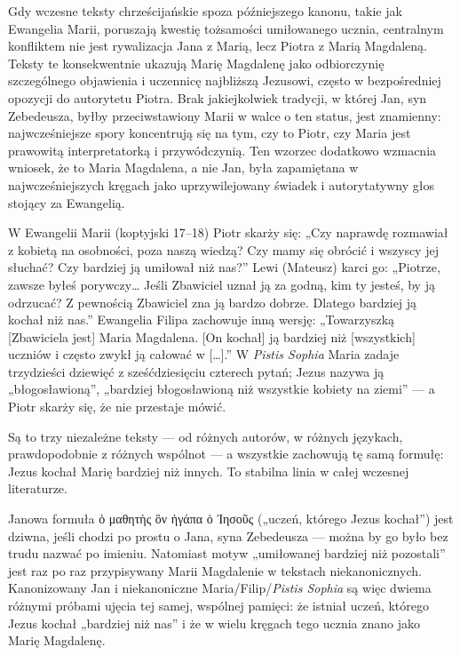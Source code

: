 Gdy wczesne teksty chrześcijańskie spoza późniejszego kanonu, takie jak Ewangelia Marii, poruszają kwestię tożsamości umiłowanego ucznia, centralnym konfliktem nie jest rywalizacja Jana z Marią, lecz Piotra z Marią Magdaleną.
Teksty te konsekwentnie ukazują Marię Magdalenę jako odbiorczynię szczególnego objawienia i uczennicę najbliższą Jezusowi, często w bezpośredniej opozycji do autorytetu Piotra.
Brak jakiejkolwiek tradycji, w której Jan, syn Zebedeusza, byłby przeciwstawiony Marii w walce o ten status, jest znamienny:
najwcześniejsze spory koncentrują się na tym, czy to Piotr, czy Maria jest prawowitą interpretatorką i przywódczynią.
Ten wzorzec dodatkowo wzmacnia wniosek, że to Maria Magdalena, a nie Jan, była zapamiętana w najwcześniejszych kręgach jako uprzywilejowany świadek i autorytatywny głos stojący za Ewangelią.

W Ewangelii Marii (koptyjski 17--18) Piotr skarży się:
„Czy naprawdę rozmawiał z kobietą na osobności, poza naszą wiedzą?
Czy mamy się obrócić i wszyscy jej słuchać?
Czy bardziej ją umiłował niż nas?”
Lewi (Mateusz) karci go:
„Piotrze, zawsze byłeś porywczy\ldots{} Jeśli Zbawiciel uznał ją za godną, kim ty jesteś, by ją odrzucać?
Z pewnością Zbawiciel zna ją bardzo dobrze.
Dlatego bardziej ją kochał niż nas.”
Ewangelia Filipa zachowuje inną wersję:
„Towarzyszką [Zbawiciela jest] Maria Magdalena.
[On kochał] ją bardziej niż [wszystkich] uczniów i często zwykł ją całować w [\ldots].”
W \textit{Pistis Sophia} Maria zadaje trzydzieści dziewięć z sześćdziesięciu czterech pytań; Jezus nazywa ją „błogosławioną”, „bardziej błogosławioną niż wszystkie kobiety na ziemi” — a Piotr skarży się, że nie przestaje mówić.

Są to trzy niezależne teksty — od różnych autorów, w różnych językach, prawdopodobnie z różnych wspólnot — a wszystkie zachowują tę samą formułę:
Jezus kochał Marię bardziej niż innych.
To stabilna linia w całej wczesnej literaturze.

Janowa formuła ὁ μαθητὴς ὃν ἠγάπα ὁ Ἰησοῦς („uczeń, którego Jezus kochał”) jest dziwna, jeśli chodzi po prostu o Jana, syna Zebedeusza — można by go było bez trudu nazwać po imieniu.
Natomiast motyw „umiłowanej bardziej niż pozostali” jest raz po raz przypisywany Marii Magdalenie w tekstach niekanonicznych.
Kanonizowany Jan i niekanoniczne Maria/Filip/\textit{Pistis Sophia} są więc dwiema różnymi próbami ujęcia tej samej, wspólnej pamięci:
że istniał uczeń, którego Jezus kochał „bardziej niż nas” i że w wielu kręgach tego ucznia znano jako Marię Magdalenę.

